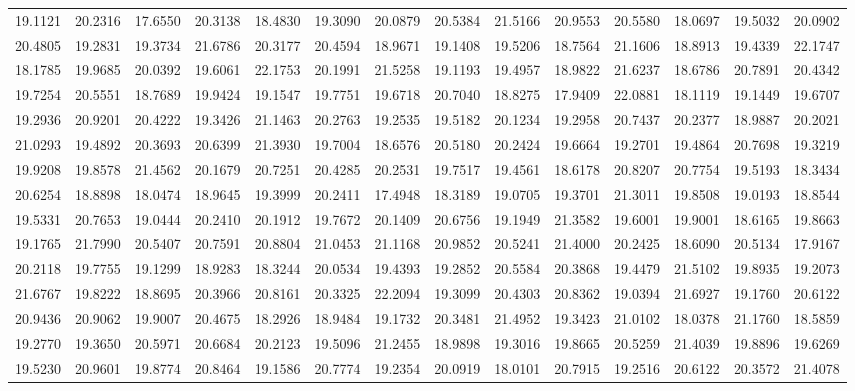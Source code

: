 \documentclass[12pt]{article}\usepackage[]{graphicx}\usepackage[]{color}
\begin{document}
\begin{landscape}
\begin{longtable}[t]{rrrrrrrrrrrrrr}
19.1121 & 20.2316 & 17.6550 & 20.3138 & 18.4830 & 19.3090 & 20.0879 & 20.5384 & 21.5166 & 20.9553 & 20.5580 & 18.0697 & 19.5032 & 20.0902\\
20.4805 & 19.2831 & 19.3734 & 21.6786 & 20.3177 & 20.4594 & 18.9671 & 19.1408 & 19.5206 & 18.7564 & 21.1606 & 18.8913 & 19.4339 & 22.1747\\
18.1785 & 19.9685 & 20.0392 & 19.6061 & 22.1753 & 20.1991 & 21.5258 & 19.1193 & 19.4957 & 18.9822 & 21.6237 & 18.6786 & 20.7891 & 20.4342\\
19.7254 & 20.5551 & 18.7689 & 19.9424 & 19.1547 & 19.7751 & 19.6718 & 20.7040 & 18.8275 & 17.9409 & 22.0881 & 18.1119 & 19.1449 & 19.6707\\
19.2936 & 20.9201 & 20.4222 & 19.3426 & 21.1463 & 20.2763 & 19.2535 & 19.5182 & 20.1234 & 19.2958 & 20.7437 & 20.2377 & 18.9887 & 20.2021\\
21.0293 & 19.4892 & 20.3693 & 20.6399 & 21.3930 & 19.7004 & 18.6576 & 20.5180 & 20.2424 & 19.6664 & 19.2701 & 19.4864 & 20.7698 & 19.3219\\
19.9208 & 19.8578 & 21.4562 & 20.1679 & 20.7251 & 20.4285 & 20.2531 & 19.7517 & 19.4561 & 18.6178 & 20.8207 & 20.7754 & 19.5193 & 18.3434\\
20.6254 & 18.8898 & 18.0474 & 18.9645 & 19.3999 & 20.2411 & 17.4948 & 18.3189 & 19.0705 & 19.3701 & 21.3011 & 19.8508 & 19.0193 & 18.8544\\
19.5331 & 20.7653 & 19.0444 & 20.2410 & 20.1912 & 19.7672 & 20.1409 & 20.6756 & 19.1949 & 21.3582 & 19.6001 & 19.9001 & 18.6165 & 19.8663\\
19.1765 & 21.7990 & 20.5407 & 20.7591 & 20.8804 & 21.0453 & 21.1168 & 20.9852 & 20.5241 & 21.4000 & 20.2425 & 18.6090 & 20.5134 & 17.9167\\
20.2118 & 19.7755 & 19.1299 & 18.9283 & 18.3244 & 20.0534 & 19.4393 & 19.2852 & 20.5584 & 20.3868 & 19.4479 & 21.5102 & 19.8935 & 19.2073\\
21.6767 & 19.8222 & 18.8695 & 20.3966 & 20.8161 & 20.3325 & 22.2094 & 19.3099 & 20.4303 & 20.8362 & 19.0394 & 21.6927 & 19.1760 & 20.6122\\
20.9436 & 20.9062 & 19.9007 & 20.4675 & 18.2926 & 18.9484 & 19.1732 & 20.3481 & 21.4952 & 19.3423 & 21.0102 & 18.0378 & 21.1760 & 18.5859\\
19.2770 & 19.3650 & 20.5971 & 20.6684 & 20.2123 & 19.5096 & 21.2455 & 18.9898 & 19.3016 & 19.8665 & 20.5259 & 21.4039 & 19.8896 & 19.6269\\
19.5230 & 20.9601 & 19.8774 & 20.8464 & 19.1586 & 20.7774 & 19.2354 & 20.0919 & 18.0101 & 20.7915 & 19.2516 & 20.6122 & 20.3572 & 21.4078\\

\end{longtable}
\end{landscape}
\end{document}
